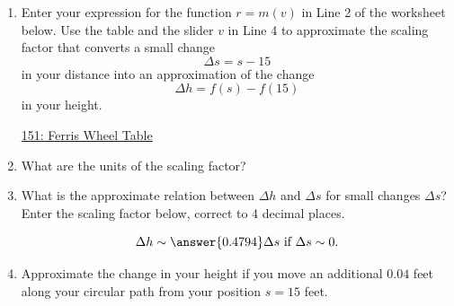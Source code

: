 \documentclass{ximera}
\begin{document}
\begin{question}
\begin{enumerate}
\begin{enumerate}
\item Enter your expression for the function $r=m(v)$ in Line 2 of the worksheet below. Use the table and the slider $v$ in Line 4 to approximate the scaling factor that converts a small change 
\[
    \Delta s = s-15
\]
in your distance into an approximation of the change 
\[
  \Delta h = f(s) - f(15)
\] 
in your height. 


\begin{onlineOnly}
    \begin{center}
\end{center}
\end{onlineOnly}

\href{https://www.desmos.com/calculator/cqprsr778n}{151: Ferris Wheel Table}

\item What are the units of the scaling factor?

\item What is the approximate relation between $\Delta h$ and $\Delta s$ for small changes $\Delta s$? Enter the scaling factor below, correct to 4 decimal places.

\[
      \Delta h \sim \answer{0.4794}\Delta s \text{ if } \Delta s \sim 0.
\]

\item Approximate the change in your height if you move an additional $0.04$ feet along your circular path from your position $s=15$ feet.

\end{enumerate}

\end{enumerate}


\end{question}
\end{document}
